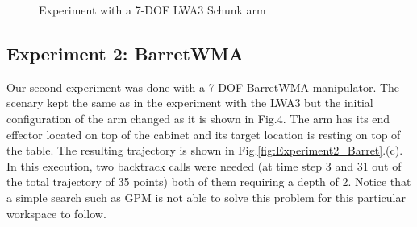 \documentclass[conference]{IEEEtran}
\begin{document}
\begin{figure}[]
  \centering
  \caption{ Experiment with a 7-DOF LWA3 Schunk arm}
  \label{fig:Experiment1_LWA3}
\end{figure}


\subsection{Experiment 2: BarretWMA}
Our second experiment was done with a 7 DOF BarretWMA
manipulator. The scenary kept the same as in the experiment
with the LWA3 but the initial configuration of the arm changed
as it is shown in Fig.4. The arm has its end effector located
on top of the cabinet and its target location is resting on top
of the table. The resulting trajectory is shown in Fig.\ref{fig:Experiment2_Barret}.(c).
In this execution, two backtrack calls were needed (at time
step 3 and 31 out of the total trajectory of 35 points) both of
them requiring a depth of 2. Notice that a simple search such
as GPM is not able to solve this problem for this particular
workspace to follow.
\end{document}
